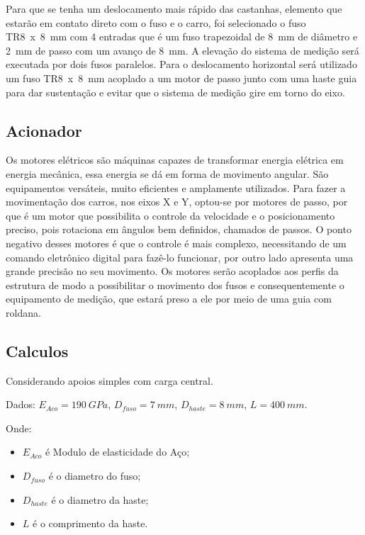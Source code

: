 Para que se tenha um deslocamento mais rápido das castanhas, elemento que estarão em contato 
direto com o fuso e o carro, foi selecionado o fuso TR8~x~8~mm com 4 entradas que é um fuso trapezoidal 
de 8~mm de diâmetro e 2~mm de passo com um avanço de 8~mm. A elevação do sistema de medição será 
executada por dois fusos paralelos. Para o deslocamento horizontal será utilizado um fuso TR8~x~8~mm 
acoplado a um motor de passo junto com uma haste guia para dar sustentação e evitar que o sistema 
de medição gire em torno do eixo.

\subsection{Acionador}\label{subsec:metacionador}

Os motores elétricos são máquinas capazes de transformar energia elétrica em energia mecânica, 
essa energia se dá em forma de movimento angular. São equipamentos versáteis, muito eficientes 
e amplamente utilizados. Para fazer a movimentação dos carros, nos eixos X e Y, optou-se por 
motores de passo, por que é um motor que possibilita o controle da velocidade e o posicionamento 
preciso, pois rotaciona em ângulos bem definidos, chamados de passos. O ponto negativo desses 
motores é que o controle é mais complexo, necessitando de um comando eletrônico digital para 
fazê-lo funcionar, por outro lado apresenta uma grande precisão no seu movimento. Os motores 
serão acoplados aos perfis da estrutura de modo a possibilitar o movimento dos fusos e consequentemente 
o equipamento de medição, que estará preso a ele por meio de uma guia com roldana. 

\subsection{Calculos}\label{subsec:metcalculos}

Considerando apoios simples com carga central.

Dados: $E_{Aco} = 190~GPa$, $D_{fuso} = 7~mm$, $D_{haste} = 8~mm$, $L = 400~mm$.

Onde:
\begin{itemize}
    \item $E_{Aco}$ é Modulo de elasticidade do Aço;
    \item $D_{fuso}$ é o diametro do fuso;
    \item $D_{haste}$ é o diametro da haste;
    \item $L$ é o comprimento da haste.
\end{itemize}

